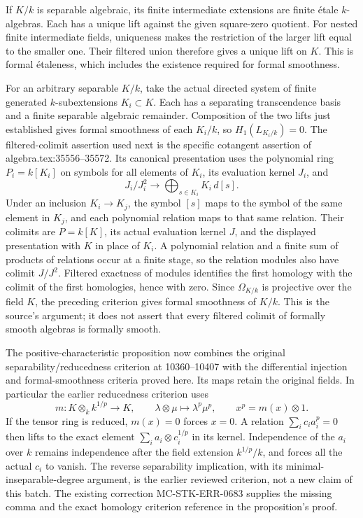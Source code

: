 If \(K/k\) is separable algebraic, its finite intermediate extensions are finite étale \(k\)-algebras. Each has a unique lift against the given square-zero quotient. For nested finite intermediate fields, uniqueness makes the restriction of the larger lift equal to the smaller one. Their filtered union therefore gives a unique lift on \(K\). This is formal étaleness, which includes the existence required for formal smoothness.

For an arbitrary separable \(K/k\), take the actual directed system of finite generated \(k\)-subextensions \(K_i\subset K\). Each has a separating transcendence basis and a finite separable algebraic remainder. Composition of the two lifts just established gives formal smoothness of each \(K_i/k\), so \(H_1(L_{K_i/k})=0\). The filtered-colimit assertion used next is the specific cotangent assertion of algebra.tex:35556--35572. Its canonical presentation uses the polynomial ring \(P_i=k[K_i]\) on symbols for all elements of \(K_i\), its evaluation kernel \(J_i\), and \[
 J_i/J_i^2 \longrightarrow \bigoplus_{s\in K_i}K_i\,d[s].
\] Under an inclusion \(K_i\to K_j\), the symbol \([s]\) maps to the symbol of the same element in \(K_j\), and each polynomial relation maps to that same relation. Their colimits are \(P=k[K]\), its actual evaluation kernel \(J\), and the displayed presentation with \(K\) in place of \(K_i\). A polynomial relation and a finite sum of products of relations occur at a finite stage, so the relation modules also have colimit \(J/J^2\). Filtered exactness of modules identifies the first homology with the colimit of the first homologies, hence with zero. Since \(\Omega_{K/k}\) is projective over the field \(K\), the preceding criterion gives formal smoothness of \(K/k\). This is the source's argument; it does not assert that every filtered colimit of formally smooth algebras is formally smooth.

The positive-characteristic proposition now combines the original separability/reducedness criterion at 10360--10407 with the differential injection and formal-smoothness criteria proved here. Its maps retain the original fields. In particular the earlier reducedness criterion uses \[
 m:K\otimes_k k^{1/p}\longrightarrow K,\qquad
 \lambda\otimes\mu\longmapsto\lambda^p\mu^p,
 \qquad x^p=m(x)\otimes1.
\] If the tensor ring is reduced, \(m(x)=0\) forces \(x=0\). A relation \(\sum_i c_i a_i^p=0\) then lifts to the exact element \(\sum_i a_i\otimes c_i^{1/p}\) in its kernel. Independence of the \(a_i\) over \(k\) remains independence after the field extension \(k^{1/p}/k\), and forces all the actual \(c_i\) to vanish. The reverse separability implication, with its minimal-inseparable-degree argument, is the earlier reviewed criterion, not a new claim of this batch. The existing correction MC-STK-ERR-0683 supplies the missing comma and the exact homology criterion reference in the proposition's proof.

